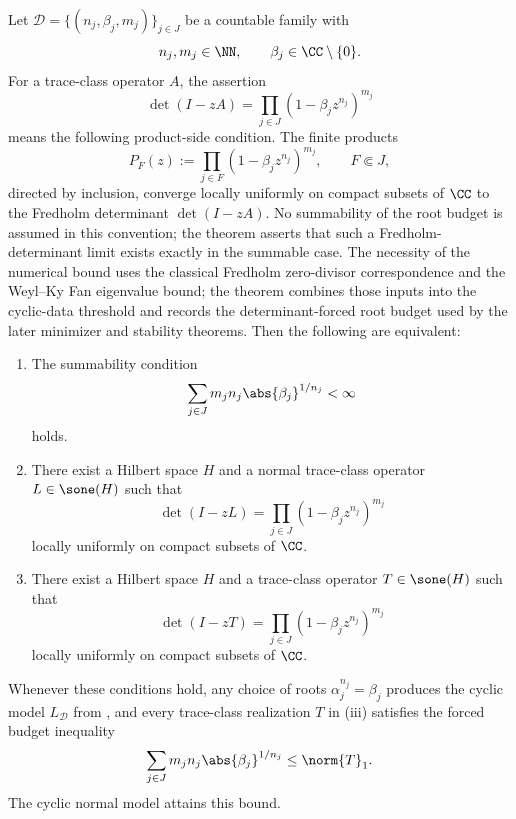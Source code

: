 \begin{theorem}
  \label{thm:normal-realizability-threshold}
  Let \(\mathcal D=\{(n_j,\beta_j,m_j)\}_{j\in J}\) be a countable
  family with
  \[
    n_j,m_j\in\NN,\qquad
    \beta_j\in\CC\setminus\{0\}.
  \]
  For a trace-class operator \(A\), the assertion
  \[
    \det(I-zA)=\prod_{j\in J}(1-\beta_j z^{n_j})^{m_j}
  \]
  means the following product-side condition. The finite products
  \[
    P_F(z):=\prod_{j\in F}(1-\beta_j z^{n_j})^{m_j},
    \qquad F\Subset J,
  \]
  directed by inclusion, converge locally uniformly on compact subsets of
  \(\CC\) to the Fredholm determinant \(\det(I-zA)\). No summability of the
  root budget is assumed in this convention; the theorem asserts that such
  a Fredholm-determinant limit exists exactly in the summable case. The
  necessity of the numerical bound uses the classical Fredholm
  zero-divisor correspondence and the Weyl--Ky Fan eigenvalue bound; the
  theorem combines those inputs into the cyclic-data threshold and records the
  determinant-forced root budget used by the later minimizer and stability
  theorems.
  Then the following are equivalent:
  \begin{enumerate}[label=\textup{(\roman*)}]
    \item The summability condition
      \[
        \sum_{j\in J}m_j n_j\abs{\beta_j}^{1/n_j}<\infty
      \]
      holds.
    \item There exist a Hilbert space \(H\) and a normal trace-class
      operator \(L\in\sone(H)\) such that
      \[
        \det(I-zL)=\prod_{j\in J}(1-\beta_j z^{n_j})^{m_j}
      \]
      locally uniformly on compact subsets of \(\CC\).
    \item There exist a Hilbert space \(H\) and a trace-class
      operator \(T\in\sone(H)\) such that
      \[
        \det(I-zT)=\prod_{j\in J}(1-\beta_j z^{n_j})^{m_j}
      \]
      locally uniformly on compact subsets of \(\CC\).
  \end{enumerate}
  Whenever these conditions hold, any choice of roots
  \(\alpha_j^{n_j}=\beta_j\) produces the cyclic model \(L_{\mathcal D}\)
  from , and every
  trace-class realization \(T\) in \textup{(iii)} satisfies the forced
  budget inequality
  \[
    \sum_{j\in J}m_j n_j\abs{\beta_j}^{1/n_j}
    \le \norm{T}_1.
  \]
  The cyclic normal model attains this bound.
\end{theorem}

